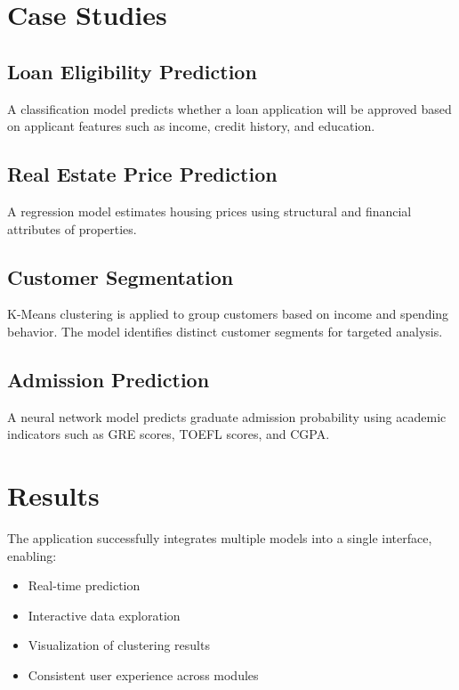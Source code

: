 \documentclass[conference]{IEEEtran}
\begin{document}
\section{Case Studies}

\subsection{Loan Eligibility Prediction}
A classification model predicts whether a loan application will be approved based on applicant features such as income, credit history, and education.

\subsection{Real Estate Price Prediction}
A regression model estimates housing prices using structural and financial attributes of properties.

\subsection{Customer Segmentation}
K-Means clustering is applied to group customers based on income and spending behavior. The model identifies distinct customer segments for targeted analysis.

\subsection{Admission Prediction}
A neural network model predicts graduate admission probability using academic indicators such as GRE scores, TOEFL scores, and CGPA.

\section{Results}

The application successfully integrates multiple models into a single interface, enabling:

\begin{itemize}
    \item Real-time prediction
    \item Interactive data exploration
    \item Visualization of clustering results
    \item Consistent user experience across modules
\end{itemize}
\end{document}

